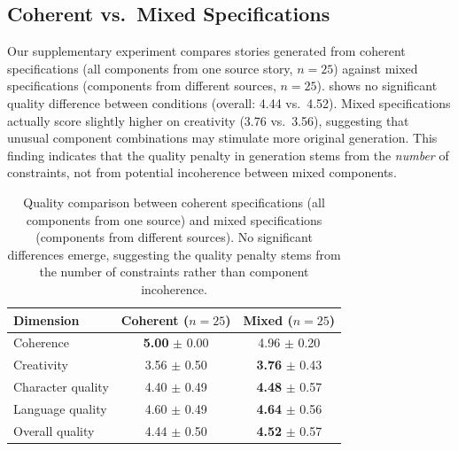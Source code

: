 \subsection{Coherent vs.\ Mixed Specifications}
\label{sec:results_mixing}

Our supplementary experiment compares stories generated from coherent specifications (all components from one source story, $n{=}25$) against mixed specifications (components from different sources, $n{=}25$).
 shows no significant quality difference between conditions (overall: 4.44 vs.\ 4.52).
Mixed specifications actually score slightly higher on creativity (3.76 vs.\ 3.56), suggesting that unusual component combinations may stimulate more original generation.
This finding indicates that the quality penalty in \compcontrolled generation stems from the \emph{number} of constraints, not from potential incoherence between mixed components.

\begin{table}[t]
    \centering
    \caption{Quality comparison between coherent specifications (all components from one source) and mixed specifications (components from different sources). No significant differences emerge, suggesting the quality penalty stems from the number of constraints rather than component incoherence.}
    \begin{tabular}{@{}lcc@{}}
        \toprule
        \textbf{Dimension} & \textbf{Coherent ($n{=}25$)} & \textbf{Mixed ($n{=}25$)} \\
        \midrule
        Coherence & \textbf{5.00} {\scriptsize $\pm$ 0.00} & 4.96 {\scriptsize $\pm$ 0.20} \\
        Creativity & 3.56 {\scriptsize $\pm$ 0.50} & \textbf{3.76} {\scriptsize $\pm$ 0.43} \\
        Character quality & 4.40 {\scriptsize $\pm$ 0.49} & \textbf{4.48} {\scriptsize $\pm$ 0.57} \\
        Language quality & 4.60 {\scriptsize $\pm$ 0.49} & \textbf{4.64} {\scriptsize $\pm$ 0.56} \\
        Overall quality & 4.44 {\scriptsize $\pm$ 0.50} & \textbf{4.52} {\scriptsize $\pm$ 0.57} \\
        \bottomrule
    \end{tabular}
    \label{tab:mixing}
\end{table}
